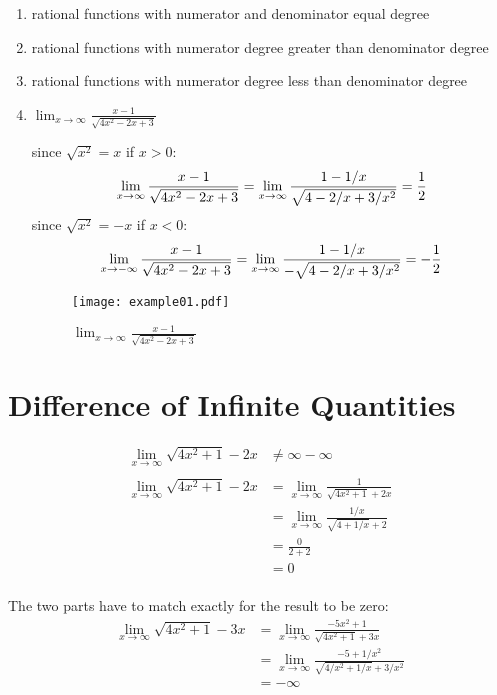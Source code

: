 \documentclass[letterpaper]{exam}
\begin{document}
  \begin{enumerate}
    \item rational functions with numerator and denominator equal degree
    \item rational functions with numerator degree greater than denominator degree
    \item rational functions with numerator degree less than denominator degree

    \item $\lim_{x \to \infty} \frac{x - 1}{\sqrt{4x^2 - 2x + 3}}$

      since $\sqrt{x^2} = x$ if $x > 0$:
      \[
        \lim_{x \to \infty} \frac{x - 1}{\sqrt{4x^2 - 2x + 3}} 
          = \lim_{x \to \infty} \frac{1 - 1/x}{\sqrt{4 - 2/x + 3/x^2}} 
          = \frac{1}{2} \\
      \]
      since $\sqrt{x^2} = -x$ if $x < 0$:
      \[
        \lim_{x \to -\infty} \frac{x - 1}{\sqrt{4x^2 - 2x + 3}} 
          = \lim_{x \to \infty} \frac{1 - 1/x}{-\sqrt{4 - 2/x + 3/x^2}} 
          = -\frac{1}{2} \\
      \]

      \begin{figure}[H]
        \centering
        \texttt{[image: example01.pdf]}
        \caption{$\lim_{x \to \infty} \frac{x - 1}{\sqrt{4x^2 - 2x + 3}}$}
        \label{fig:example01}
      \end{figure}

  \end{enumerate}

  \section{Difference of Infinite Quantities}

  \begin{align*}
    \lim_{x \to \infty} \sqrt{4x^2 + 1} - 2x & \neq \infty - \infty \\
    \\
    \lim_{x \to \infty} \sqrt{4x^2 + 1} - 2x & = \lim_{x \to \infty} \frac{1}{\sqrt{4x^2 + 1} + 2x} \\
      & = \lim_{x \to \infty} \frac{1/x}{\sqrt{4 + 1/x} + 2} \\
      & = \frac{0}{2 + 2} \\
      & = \boxed{ 0 } \\
  \end{align*}

  The two parts have to match exactly for the result to be zero:
  \begin{align*}
    \lim_{x \to \infty} \sqrt{4x^2 + 1} - 3x & = \lim_{x \to \infty} \frac{-5x^2 + 1}{\sqrt{4x^2 + 1} + 3x} \\
      & = \lim_{x \to \infty} \frac{-5 + 1/x^2}{\sqrt{4/x^2 + 1/x} + 3/x^2} \\
      & = \boxed{ -\infty } \\
  \end{align*}
\end{document}
